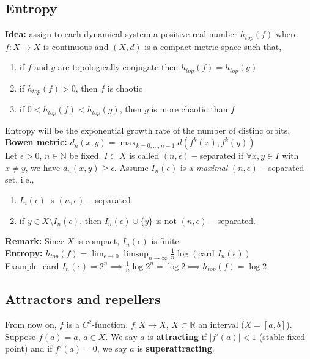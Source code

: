 \documentclass[12pt]{article}
\begin{document}
\subsection{Entropy}

\textbf{Idea:} assign to each dynamical system a positive real number $h_{top}(f)$ where $f: X \to X$ is continuous and $(X, d)$ is a compact metric space such that,
\begin{enumerate}
\item if $f$ and $g$ are topologically conjugate then $h_{top}(f) = h_{top}(g)$
\item if $h_{top}(f) > 0$, then $f$ is chaotic
\item if $0 < h_{top}(f) < h_{top}(g)$, then $g$ is more chaotic than $f$
\end{enumerate}

Entropy will be the exponential growth rate of the number of distinc orbits.\\

\textbf{Bowen metric:} $d_n(x,y) = \max_{k = 0, \ldots, n-1} d(f^k(x), f^k(y))$\\

Let $\epsilon > 0$, $n \in \mathbb{N}$ be fixed. $I \subset X$ is called $(n, \epsilon)-$separated if $\forall x, y \in I$ with $x \neq y$, we have $d_n(x, y) \geq \epsilon$. Assume $I_n(\epsilon)$ is a \textit{maximal} $(n, \epsilon)-$separated set, i.e.,
\begin{enumerate}
\item $I_n(\epsilon)$ is $(n, \epsilon)-$separated
\item if $y \in X \setminus I_n(\epsilon)$, then $I_n(\epsilon) \cup \{y\}$ is not $(n, \epsilon)-$separated.
\end{enumerate}

\textbf{Remark:} Since $X$ is compact, $I_n(\epsilon)$ is finite.\\

\textbf{Entropy:} $h_{top}(f) = \lim_{\epsilon \to 0} \limsup_{n \to \infty} \frac{1}{n} \log \left( \text{card } I_n(\epsilon)\right)$\\

Example: card $I_n(\epsilon) = 2^n \implies \frac{1}{n} \log 2^n = \log 2 \implies h_{top}(f) = \log 2$

\subsection{Attractors and repellers}

From now on, $f$ is a $C^2$-function. $f: X \to X$, $X \subset \mathbb{R}$ an interval ($X = [a,b]$). Suppose $f(a) = a$, $a \in X$. We say $a$ is \textbf{attracting} if $|f'(a)| < 1$ (stable fixed point) and if $f'(a) = 0$, we say $a$ is \textbf{superattracting}.\\
\end{document}
